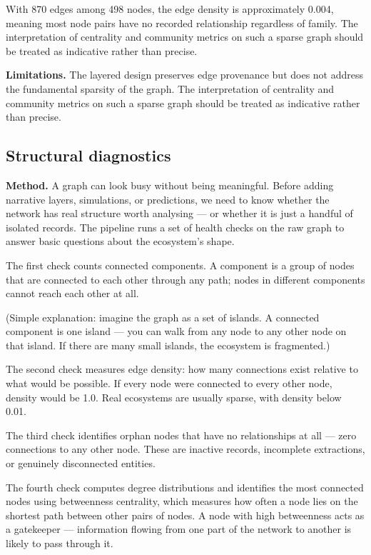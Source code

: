 \documentclass[11pt,a4paper]{article}
\begin{document}
With 870 edges among 498 nodes, the edge density is approximately 0.004,
meaning most node pairs have no recorded relationship regardless of
family. The interpretation of centrality and community metrics on such a
sparse graph should be treated as indicative rather than precise.

\textbf{Limitations.} The layered design preserves edge provenance but does
not address the fundamental sparsity of the graph. The interpretation of
centrality and community metrics on such a sparse graph should be treated
as indicative rather than precise.

\subsection{Structural diagnostics}

\textbf{Method.} A graph can look busy without being meaningful. Before adding
narrative layers, simulations, or predictions, we need to know whether
the network has real structure worth analysing — or whether it is just a
handful of isolated records. The pipeline runs a set of health checks on
the raw graph to answer basic questions about the ecosystem's shape.

The first check counts connected components. A component is a group of
nodes that are connected to each other through any path; nodes in
different components cannot reach each other at all.

(Simple explanation: imagine the graph as a set of islands. A connected
component is one island — you can walk from any node to any other node
on that island. If there are many small islands, the ecosystem is
fragmented.)

The second check measures edge density: how many connections exist
relative to what would be possible. If every node were connected to
every other node, density would be 1.0. Real ecosystems are usually
sparse, with density below 0.01.

The third check identifies orphan nodes that have no relationships at
all — zero connections to any other node. These are inactive records,
incomplete extractions, or genuinely disconnected entities.

The fourth check computes degree distributions and identifies the most
connected nodes using betweenness centrality, which measures how often
a node lies on the shortest path between other pairs of nodes. A node
with high betweenness acts as a gatekeeper — information flowing from
one part of the network to another is likely to pass through it.
\end{document}
